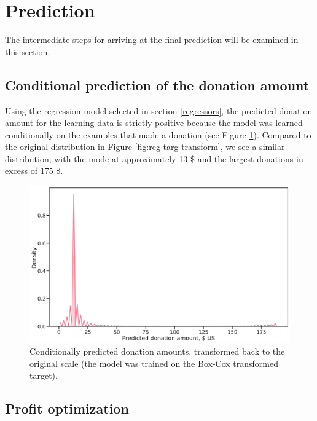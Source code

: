 \documentclass[
  11pt,
  a4paper,
  DIV=12,captions=tableheading,oneside,titlepage=firstiscover,abstracton]{scrreprt}
\begin{document}
\hypertarget{prediction}{%
\section{Prediction}\label{prediction}}

The intermediate steps for arriving at the final prediction will be examined in this section.

\hypertarget{conditional-prediction-of-the-donation-amount}{%
\subsection{Conditional prediction of the donation amount}\label{conditional-prediction-of-the-donation-amount}}

Using the regression model selected in section \ref{regressors}, the predicted donation amount for the learning data is strictly positive because the model was learned conditionally on the examples that made a donation (see Figure \ref{fig:y-d-predict}). Compared to the original distribution in Figure \ref{fig:reg-targ-transform}, we see a similar distribution, with the mode at approximately 13 \$ and the largest donations in excess of 175 \$.



\begin{figure}

{\centering \includegraphics[width=0.6\linewidth]{figures/predictions/y_d_predicted-inverse-transform} 

}

\caption{Conditionally predicted donation amounts, transformed back to the original scale (the model was trained on the Box-Cox transformed target).}\label{fig:y-d-predict}
\end{figure}

\hypertarget{profit-optimization}{%
\subsection{Profit optimization}\label{profit-optimization}}
\end{document}
